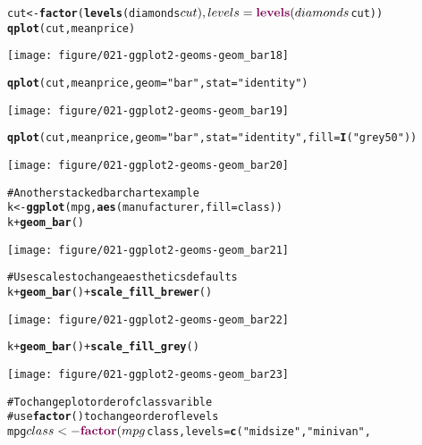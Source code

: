 \documentclass[a4paper,titlepage]{tufte-handout}\usepackage{graphicx, color}
\makeatletter
\def\maxwidth{ %
  \ifdim\Gin@nat@width>\linewidth
    \linewidth
  \else
    \Gin@nat@width
  \fi
}
\newcommand{\hlfunctioncall}[1]{\textcolor[rgb]{0.501960784313725,0,0.329411764705882}{\textbf{#1}}}%
\newcommand{\hlstring}[1]{\textcolor[rgb]{0.6,0.6,1}{#1}}%
\newcommand{\hlcomment}[1]{\textcolor[rgb]{0.180392156862745,0.6,0.341176470588235}{#1}}%
\newenvironment{kframe}{%
 \def\at@end@of@kframe{}%
 \ifinner\ifhmode%
  \def\at@end@of@kframe{\end{minipage}}%
  \begin{minipage}{\columnwidth}%
 \fi\fi%
 \def\FrameCommand##1{\hskip\@totalleftmargin \hskip-\fboxsep
 \colorbox{shadecolor}{##1}\hskip-\fboxsep
     \hskip-\linewidth \hskip-\@totalleftmargin \hskip\columnwidth}%
 \MakeFramed {\advance\hsize-\width
   \@totalleftmargin\z@ \linewidth\hsize
   \@setminipage}}%
 {\par\unskip\endMakeFramed%
 \at@end@of@kframe}
\newenvironment{knitrout}{}{} %
\makeatother
\begin{document}
\begin{knitrout}
\begin{kframe}
\begin{alltt}
cut <- \hlfunctioncall{factor}(\hlfunctioncall{levels}(diamonds$cut), levels = \hlfunctioncall{levels}(diamonds$cut))
\hlfunctioncall{qplot}(cut, meanprice)
\end{alltt}
\end{kframe}\texttt{[image: figure/021-ggplot2-geoms-geom\_bar18]} \begin{kframe}\begin{alltt}
\hlfunctioncall{qplot}(cut, meanprice, geom=\hlstring{"bar"}, stat=\hlstring{"identity"})
\end{alltt}
\end{kframe}\texttt{[image: figure/021-ggplot2-geoms-geom\_bar19]} \begin{kframe}\begin{alltt}
\hlfunctioncall{qplot}(cut, meanprice, geom=\hlstring{"bar"}, stat=\hlstring{"identity"}, fill = \hlfunctioncall{I}(\hlstring{"grey50"}))
\end{alltt}
\end{kframe}\texttt{[image: figure/021-ggplot2-geoms-geom\_bar20]} \begin{kframe}\begin{alltt}
\hlcomment{# Another stacked bar chart example}
k <- \hlfunctioncall{ggplot}(mpg, \hlfunctioncall{aes}(manufacturer, fill=class))
k + \hlfunctioncall{geom_bar}()
\end{alltt}
\end{kframe}\texttt{[image: figure/021-ggplot2-geoms-geom\_bar21]} \begin{kframe}\begin{alltt}
\hlcomment{# Use scales to change aesthetics defaults}
k + \hlfunctioncall{geom_bar}() + \hlfunctioncall{scale_fill_brewer}()
\end{alltt}
\end{kframe}\texttt{[image: figure/021-ggplot2-geoms-geom\_bar22]} \begin{kframe}\begin{alltt}
k + \hlfunctioncall{geom_bar}() + \hlfunctioncall{scale_fill_grey}()
\end{alltt}
\end{kframe}\texttt{[image: figure/021-ggplot2-geoms-geom\_bar23]} \begin{kframe}\begin{alltt}
\hlcomment{# To change plot order of class varible}
\hlcomment{# use \hlfunctioncall{factor}() to change order of levels}
mpg$class <- \hlfunctioncall{factor}(mpg$class, levels = \hlfunctioncall{c}(\hlstring{"midsize"}, \hlstring{"minivan"},

\end{alltt}
\end{kframe}
\end{knitrout}
\end{document}
